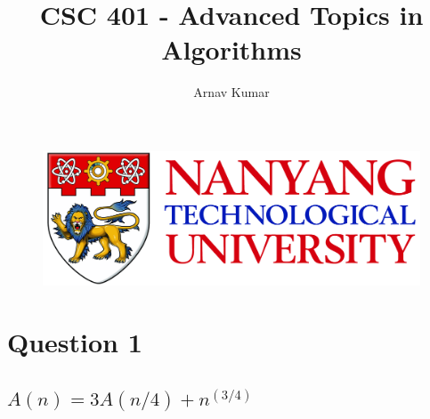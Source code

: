 \documentclass{article}
\begin{document}
\begin{figure}[t]
\includegraphics[width=\linewidth]{images/NTULogo}
\end{figure}
\title{CSC 401 - Advanced Topics in Algorithms}
\author{Arnav Kumar}

\maketitle

\newpage
\section{Question 1}

\subsection{$A(n) = 3A(n/4) + n^{(3/4)}$}
\end{document}

